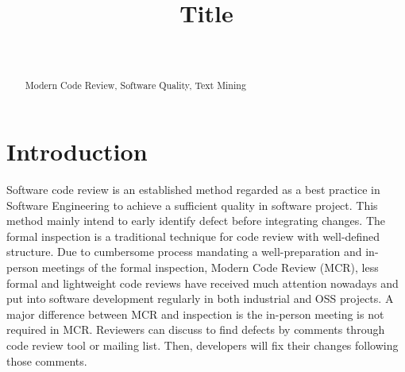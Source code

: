 \documentclass[conference]{IEEEtran}
\begin{document}
\title{Title}

\author{
\\


}


\maketitle
{}
{\newcommand{\nbnote}[2]{
  \fcolorbox{blue}{yellow}{\bfseries\sffamily\scriptsize#1}
  {\sf\small\textit{#2}}
 }
}
{\newcommand{\nbnote}[2]{}
 \newcommand{\version}{}
}
\newcommand\pick[1]{\nbnote{Pick sez}{\textcolor{magenta}{#1}}}
\newcommand\thai[1]{\nbnote{Thai sez}{\textcolor{blue}{#1}}}


\begin{abstract}




\begin{IEEEkeywords}
Modern Code Review, Software Quality, Text Mining
\end{IEEEkeywords}
\end{abstract}

\section{Introduction}
Software code review is an established method regarded as a best practice in Software Engineering to achieve a sufficient quality in software project. This method mainly intend to early identify defect before integrating changes. The formal inspection\cite{Fagan:1976:DCI:1661010.1661012} is a traditional technique for code review with well-defined structure.
Due to cumbersome process mandating a well-preparation and in-person meetings of the formal inspection, Modern Code Review (MCR)\cite{Bacchelli2013a}, less formal and lightweight code reviews have received much attention nowadays and  put into software development regularly in both industrial and OSS projects. A major difference between MCR and inspection is the in-person meeting is not required in MCR. Reviewers can discuss to find defects by comments through code review tool or mailing list. Then, developers will fix their changes following those comments.
\end{document}
